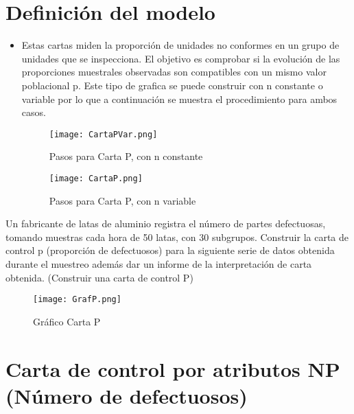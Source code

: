 \documentclass{article}
\theoremstyle{mytheoremstyle}
\theoremstyle{mytheoremstyle}
\theoremstyle{myproblemstyle}
\begin{document}
\section{Definición del modelo}
    \begin{itemize}
        \item Estas cartas miden la proporción de unidades no conformes en un grupo de unidades que se
        inspecciona. El objetivo es comprobar si la evolución de las proporciones muestrales observadas
        son compatibles con un mismo valor poblacional p.
        Este tipo de grafica se puede construir con n constante o variable por lo que a continuación se
        muestra el procedimiento para ambos casos.
        \begin{figure}[!ht]
            \centering
            \texttt{[image: CartaPVar.png]}
            \caption[short]{Pasos para Carta P, con n constante}
            \label{fig:cartaP_n_constante} %
          \end{figure}
        \begin{figure}[H]
            \centering
            \texttt{[image: CartaP.png]}
            \caption[short]{Pasos para Carta P, con n variable}
            \label{fig:cartaP_n_variable} %
          \end{figure}
    
    \end{itemize}
    Un fabricante de latas de aluminio registra el número de partes defectuosas, tomando
    muestras cada hora de 50 latas, con 30 subgrupos. Construir la carta de control p (proporción de
    defectuosos) para la siguiente serie de datos obtenida durante el muestreo además dar un
    informe de la interpretación de carta obtenida. (Construir una carta de control P)
    \begin{figure}[ht!]
        \centering
        \texttt{[image: GrafP.png]}
        \caption[short]{Gráfico Carta P}
        \label{fig:graficoP} %
      \end{figure}
      \newpage
\section{Carta de control por atributos NP (Número de defectuosos)}
\end{document}
